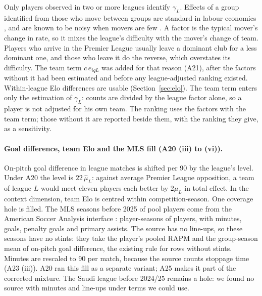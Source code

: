 \documentclass[11pt,a4paper]{article}
\begin{document}
Only players observed in two or more leagues identify $\gamma_L$. Effects of a
group identified from those who move between groups are standard in labour
economics \citep{abowd1999wage}, and are known to be noisy when movers are few
\citep{andrews2008mobility}. A factor is the typical mover's change in rate, so
it mixes the league's difficulty with the mover's change of team. Players who
arrive in the Premier League usually leave a dominant club for a less dominant
one, and those who leave it do the reverse, which overstates its difficulty.
The team term $c\, e_{iqL}$ was added for that reason (A21), after the factors
without it had been estimated and before any league-adjusted ranking existed.
Within-league Elo differences are usable (Section~\ref{sec:elo}). The team term
enters only the estimation of $\gamma_L$: counts are divided by the league
factor alone, so a player is not adjusted for his own team. The ranking uses
the factors with the team term; those without it are reported beside them, with
the ranking they give, as a sensitivity.

\paragraph{Goal difference, team Elo and the MLS fill (A20 (iii) to (vi)).}
On-pitch goal difference in league matches is shifted per 90 by the league's
level. Under A20 the level is $22\,\hat\mu_L$: against average Premier League
opposition, a team of league $L$ would meet eleven players each better by
$2\mu_L$ in total effect. In the context dimension, team Elo is centred within
competition-season. One coverage hole is filled. The MLS seasons before 2025
of pool players come from the American Soccer Analysis interface
\citep{asa2026api}: \NMlsFillRows{} player-seasons of \NMlsFillPlayers{}
players, with minutes, goals, penalty goals and primary assists. The source
has no line-ups, so these seasons have no stints: they take the player's
pooled RAPM and the group-season mean of on-pitch goal difference, the
existing rule for rows without stints. Minutes are rescaled to 90 per match,
because the source counts stoppage time (A23 (iii)). A20 ran this fill as a
separate variant; A25 makes it part of the corrected mixture. The Saudi league
before 2024/25 remains a hole: we found no source with minutes and line-ups
under terms we could use.
\end{document}
